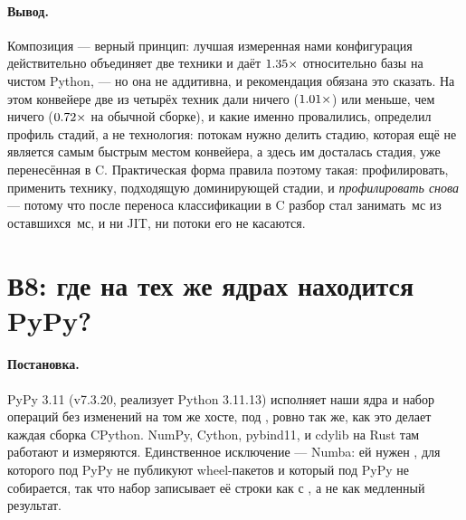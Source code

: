\paragraph{Вывод.} Композиция --- верный принцип: лучшая измеренная нами конфигурация
действительно объединяет две техники и даёт $\meas{ratio:b7_pipeline-gil:end_to_end/gil/v0_pure|b7_pipeline-gil:end_to_end/gil/v2_numba_native}{1.35}\times$ относительно базы на чистом Python, --- но
она не аддитивна, и рекомендация обязана это сказать. На этом конвейере две из четырёх техник дали
ничего ($\meas{ratio:b7_pipeline-gil:end_to_end/gil/v0_pure|b7_pipeline-gil:end_to_end/gil/v1_numba}{1.01}\times$) или меньше, чем ничего ($\meas{ratio:b7_pipeline-gil:end_to_end/gil/v0_pure|b7_pipeline-gil:end_to_end/gil/v3_native_threads}{0.72}\times$ на обычной сборке), и какие именно
провалились, определил профиль стадий, а не технология: потокам нужно делить стадию, которая ещё не
является самым быстрым местом конвейера, а здесь им досталась стадия, уже перенесённая в C.
Практическая форма правила поэтому такая: профилировать, применить технику, подходящую доминирующей
стадии, и \emph{профилировать снова} --- потому что после переноса классификации в C разбор стал
занимать \,мс из оставшихся \,мс, и ни JIT, ни потоки его не касаются.

\section{В8: где на тех же ядрах находится PyPy?}
\label{sec:rq8}


\paragraph{Постановка.} PyPy 3.11 (v7.3.20, реализует Python 3.11.13) исполняет наши ядра и набор
операций без изменений на том же хосте, под , ровно так же, как это делает каждая
сборка CPython. NumPy, Cython, pybind11,  и cdylib на Rust там работают и измеряются.
Единственное исключение --- Numba: ей нужен , для которого под PyPy не публикуют
wheel-пакетов и который под PyPy не собирается, так что набор записывает её строки как  с
, а не как медленный результат.

